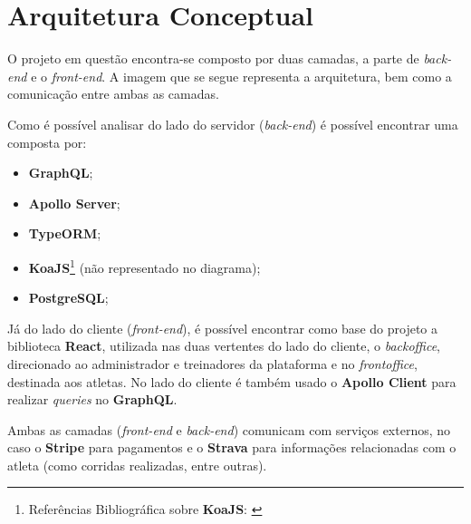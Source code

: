 \section{Arquitetura Conceptual}

O projeto em questão encontra-se composto por duas camadas, a parte de \textit{back-end} e o \textit{front-end}. A imagem que se segue representa a arquitetura, bem como a comunicação entre ambas as camadas.


Como é possível analisar do lado do servidor (\textit{back-end}) é possível encontrar uma \textbf{} composta por:

\begin{itemize}
	\item \textbf{GraphQL};
	\item \textbf{Apollo Server};
	\item \textbf{TypeORM};
	\item \textbf{KoaJS}\footnote{Referências Bibliográfica sobre \textbf{KoaJS}: \cite{expressVsKoa,introkoa}} {\small(não representado no diagrama)};
	\item \textbf{PostgreSQL};
\end{itemize}

Já do lado do cliente (\textit{front-end}), é possível encontrar como base do projeto a biblioteca \textbf{React}, utilizada nas duas vertentes do lado do cliente, o \textit{backoffice}, direcionado ao administrador e treinadores da plataforma e no \textit{frontoffice}, destinada aos atletas. No lado do cliente é também usado o \textbf{Apollo Client} para realizar \textit{queries} no \textbf{GraphQL}.

Ambas as camadas (\textit{front-end} e \textit{back-end}) comunicam com serviços externos, no caso o \textbf{Stripe} para pagamentos e o \textbf{Strava} para informações relacionadas com o atleta (como corridas realizadas, entre outras).